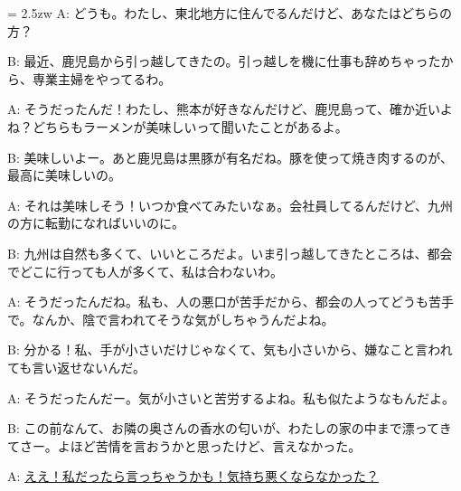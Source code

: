 \documentclass[11pt]{amsart}
\title{}
\author{}
\newenvironment{hangall}[1]{\hangindent = 2.5zw\everypar{\hangindent = 2.5zw}}{}
\begin{document}
\maketitle
\begin{hangall}{}%
A: どうも。わたし、東北地方に住んでるんだけど、あなたはどちらの方？

B: 最近、鹿児島から引っ越してきたの。引っ越しを機に仕事も辞めちゃったから、専業主婦をやってるわ。

A: そうだったんだ！わたし、熊本が好きなんだけど、鹿児島って、確か近いよね？どちらもラーメンが美味しいって聞いたことがあるよ。

B: 美味しいよー。あと鹿児島は黒豚が有名だね。豚を使って焼き肉するのが、最高に美味しいの。

A: それは美味しそう！いつか食べてみたいなぁ。会社員してるんだけど、九州の方に転勤になればいいのに。

B: 九州は自然も多くて、いいところだよ。いま引っ越してきたところは、都会でどこに行っても人が多くて、私は合わないわ。

A: そうだったんだね。私も、人の悪口が苦手だから、都会の人ってどうも苦手で。なんか、陰で言われてそうな気がしちゃうんだよね。

B: 分かる！私、手が小さいだけじゃなくて、気も小さいから、嫌なこと言われても言い返せないんだ。

A: そうだったんだー。気が小さいと苦労するよね。私も似たようなもんだよ。

B: この前なんて、お隣の奥さんの香水の匂いが、わたしの家の中まで漂ってきてさー。よほど苦情を言おうかと思ったけど、言えなかった。

A: \ul{ええ！私だったら言っちゃうかも！気持ち悪くならなかった？}\end{hangall}
\end{document}
